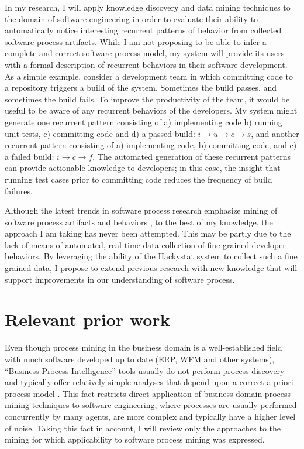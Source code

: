 \documentclass{sig-alternate}
\begin{document}
In my research, I will apply knowledge discovery and data mining techniques to the domain of software engineering in order to evaluate their ability to automatically notice interesting recurrent patterns of behavior from collected software process artifacts. While I am not proposing to be able to infer a complete and correct software process model, my system will provide its users with a formal description of recurrent behaviors in their software development. As a simple example, consider a development team in which committing code to a repository triggers a build of the system. Sometimes the build passes, and sometimes the build fails. To improve the productivity of the team, it would be useful to be aware of any recurrent behaviors of the developers. My system might generate one recurrent pattern consisting of a) implementing code b) running unit tests, c) committing code and d) a passed build: $i \rightarrow u \rightarrow c \rightarrow s $, and another recurrent pattern consisting of a) implementing code, b) committing code, and c) a failed build: $i \rightarrow c \rightarrow f $. The automated generation of these recurrent patterns can provide actionable knowledge to developers; in this case, the insight that running test cases prior to committing code reduces the frequency of build failures.

Although the latest trends in software process research emphasize mining of software process artifacts and behaviors \cite{citeulike:5043664} \cite{citeulike:1885717} \cite{citeulike:5112229} \cite{citeulike:1885717}, to the best of my knowledge, the approach I am taking has never been attempted. This may be partly due to the lack of means of automated, real-time data collection of fine-grained developer behaviors. By leveraging the ability of the Hackystat system \cite{citeulike:4041809} to collect such a fine grained data, I propose to extend previous research with new knowledge that will support improvements in our understanding of software process.

\section{Relevant prior work}
Even though process mining in the business domain is a well-established field with much software developed up to date (ERP, WFM and other systems), ``Business Process Intelligence'' tools usually do not perform process discovery and typically offer relatively simple analyses that depend upon a correct a-priori process model \cite{citeulike:3718014} \cite{citeulike:5044991}. This fact restricts direct application of business domain process mining techniques to software engineering, where processes are usually performed concurrently by many agents, are more complex and typically have a higher level of noise. Taking this fact in account, I will review only the approaches to the mining for which applicability to software process mining was expressed. 
\end{document}
